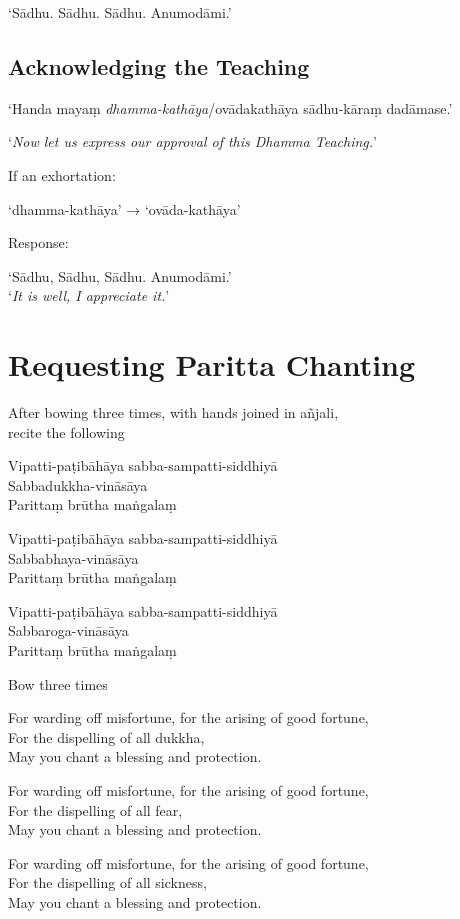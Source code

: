 ‘Sādhu. Sādhu. Sādhu. Anumodāmi.’

\subsection{Acknowledging the Teaching}

‘Handa mayaṃ \emph{dhamma-kathāya}/ovādakathāya sādhu-kāraṃ dadāmase.’

‘\emph{Now let us express our approval of this Dhamma Teaching.}’

If an exhortation:

‘dhamma-kathāya’ → ‘ovāda-kathāya’

Response:

‘Sādhu, Sādhu, Sādhu. Anumodāmi.’\\
‘\emph{It is well, I appreciate it.}’

\section{Requesting Paritta Chanting}

\begin{instruction}
  After bowing three times, with hands joined in añjali,\\
  recite the following
\end{instruction}

Vipatti-paṭibāhāya sabba-sampatti-siddhiyā\\
Sabbadukkha-vināsāya\\
Parittaṃ brūtha maṅgalaṃ

Vipatti-paṭibāhāya sabba-sampatti-siddhiyā\\
Sabbabhaya-vināsāya\\
Parittaṃ brūtha maṅgalaṃ

Vipatti-paṭibāhāya sabba-sampatti-siddhiyā\\
Sabbaroga-vināsāya\\
Parittaṃ brūtha maṅgalaṃ

\begin{instruction}
  Bow three times
\end{instruction}

\begin{english}
For warding off misfortune, for the arising of good fortune,\\
For the dispelling of all dukkha,\\
May you chant a blessing and protection.

For warding off misfortune, for the arising of good fortune,\\
For the dispelling of all fear,\\
May you chant a blessing and protection.

For warding off misfortune, for the arising of good fortune,\\
For the dispelling of all sickness,\\
May you chant a blessing and protection.
\end{english}

